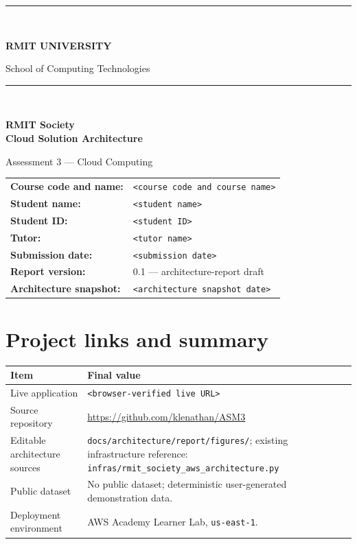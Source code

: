 \documentclass[11pt,a4paper]{article}
\newcommand{\placeholder}[1]{\textcolor{red!65!black}{\texttt{<#1>}}}
\newcommand{\liveurl}{\placeholder{browser-verified live URL}}
\newcommand{\snapshotdate}{\placeholder{architecture snapshot date}}
\begin{document}
\begin{titlepage}
  \thispagestyle{empty}
  \vspace*{8mm}
  {\color{black}\rule{\textwidth}{2.2pt}}\\[8mm]
  {\Huge\bfseries RMIT UNIVERSITY\par}
  \vspace{4mm}
  {\Large School of Computing Technologies\par}
  \vfill
  {\color{black}\rule{\textwidth}{0.8pt}}\\[10mm]
  {\Huge\bfseries RMIT Society\\[2mm] Cloud Solution Architecture\par}
  \vspace{7mm}
  {\Large Assessment 3 --- Cloud Computing\par}
  \vspace{12mm}
  \begin{tabularx}{\textwidth}{@{}>{\bfseries}lY@{}}
    Course code and name: & \placeholder{course code and course name}\\
    Student name: & \placeholder{student name}\\
    Student ID: & \placeholder{student ID}\\
    Tutor: & \placeholder{tutor name}\\
    Submission date: & \placeholder{submission date}\\
    Report version: & 0.1 --- architecture-report draft\\
    Architecture snapshot: & \snapshotdate\\
  \end{tabularx}
  \vfill
  \vspace*{8mm}
\end{titlepage}

\tableofcontents
\clearpage
{}

\section{Project links and summary}
\begin{tabularx}{\textwidth}{@{}lY@{}}
\toprule
\textbf{Item} & \textbf{Final value}\\
\midrule
Live application & \liveurl\\
Source repository & \url{https://github.com/klenathan/ASM3}\\
Editable architecture sources & \texttt{docs/architecture/report/figures/}; existing infrastructure reference: \texttt{infras/rmit\_society\_aws\_architecture.py}\\
Public dataset & No public dataset; deterministic user-generated demonstration data.\\
Deployment environment & AWS Academy Learner Lab, \texttt{us-east-1}.\\
\bottomrule
\end{tabularx}
\end{document}
